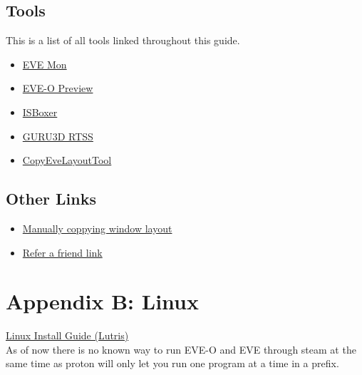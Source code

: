 \documentclass{article}
\begin{document}
\subsection*{Tools}
This is a list of all tools linked throughout this guide.
\begin{itemize}
  \item \href{https://evemondevteam.github.io/evemon/}{EVE Mon}
  \item \href{https://github.com/Proopai/eve-o-preview}{EVE-O Preview}
  \item \href{https://isboxer.com/}{ISBoxer}
  \item \href{https://www.guru3d.com/download/rtss-rivatuner-statistics-server-download}{GURU3D RTSS}
  \item \href{https://github.com/kshannoninnes/CopyEveLayoutTool}{CopyEveLayoutTool}
\end{itemize}

\subsection*{Other Links}
\begin{itemize}
  \item \href{https://forums.eveonline.com/t/manually-copy-settings-between-characters-and-accounts/32704}{Manually coppying window layout}
  \item \href{https://www.eveonline.com/signup?invc=79ffb3de-ef43-400b-a568-e45ac72c6715}{Refer a friend link}
\end{itemize}

\section*{Appendix B: Linux}
\href{https://www.reddit.com/r/Eve/comments/1hqjm4a/linux_lutris_eve_online_eveo_preview/}{Linux Install Guide (Lutris)}\\
As of now there is no known way to run EVE-O and EVE through steam at the same time as proton will only let you run one program 
at a time in a prefix.

\end{document}
